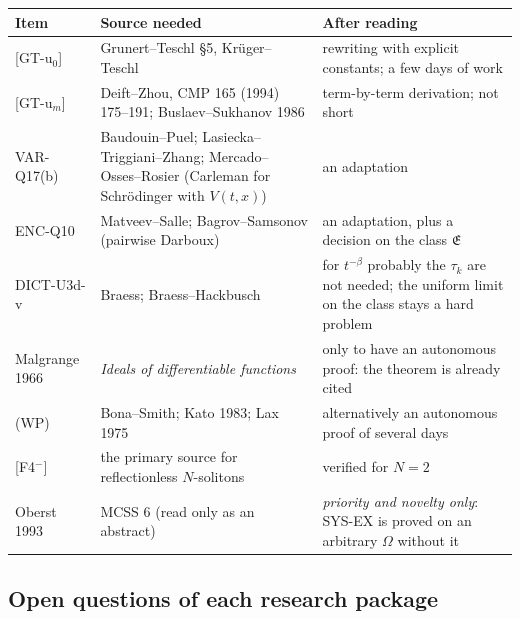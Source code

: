 \begin{center}\small
\begin{longtable}{@{}L{2.4cm}L{5.4cm}L{7.0cm}@{}}
\toprule
Item & Source needed & After reading\\\midrule\endhead
{[GT-u$_0$]} & Grunert--Teschl \S5, Kr\"uger--Teschl & rewriting with explicit constants; a few days of work\\
{[GT-u$_m$]} & Deift--Zhou, CMP 165 (1994) 175--191; Buslaev--Sukhanov 1986 & term-by-term derivation; not short\\
VAR-Q17(b) & Baudouin--Puel; Lasiecka--Triggiani--Zhang; Mercado--Osses--Rosier (Carleman for Schr\"odinger with $V(t,x)$) & an adaptation\\
ENC-Q10 & Matveev--Salle; Bagrov--Samsonov (pairwise Darboux) & an adaptation, plus a decision on the class $\mathfrak E$\\
DICT-U3d-v & Braess; Braess--Hackbusch & for $t^{-\beta}$ probably the $\tau_k$ are not needed; the uniform limit on the class stays a hard problem\\
Malgrange 1966 & \emph{Ideals of differentiable functions} & only to have an autonomous proof: the theorem is already cited\\
(WP) & Bona--Smith; Kato 1983; Lax 1975 & alternatively an autonomous proof of several days\\
{[F4$^-$]} & the primary source for reflectionless $N$-solitons & verified for $N=2$\\
Oberst 1993 & MCSS 6 (read only as an abstract) & \emph{priority and novelty only}: SYS-EX is proved on an arbitrary $\Omega$ without it\\
\bottomrule
\end{longtable}
\end{center}

\subsection{Open questions of each research package}

